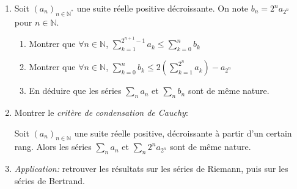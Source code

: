 \documentclass{yann}
\begin{document}
\begin{enumerate}
\item
Soit $(a_n)_{n∈ℕ^*}$ une suite réelle positive décroissante.
  On note $b_n = 2^n a_{2^n}$ pour $n∈ℕ$.
  \begin{enumerate}
  \item
Montrer que $∀n∈ℕ$, $∑_{k = 1}^{2^{n+1}-1} a_k≤∑_{k=0}^n b_k$
  \item
Montrer que $∀n∈ℕ$, $∑_{k = 0}^n b_k ≤2\left( ∑_{k=1}^{2^n} a_k \right) - a_{2^n}$
  \item
En déduire que les séries $∑_n a_n$ et $∑_n b_n$ sont de même nature.
  \end{enumerate}
\item
Montrer le \emph{critère de condensation de Cauchy}:

  Soit $(a_n)_{n∈ℕ}$ une suite réelle positive, décroissante à partir d'un certain rang.
  Alors les séries $∑_n a_n$ et $∑_n 2^n a_{2^n}$ sont de même nature.
\item
\emph{Application:} retrouver les résultats sur les séries de Riemann, puis sur les séries de Bertrand.
\end{enumerate}
\end{document}

